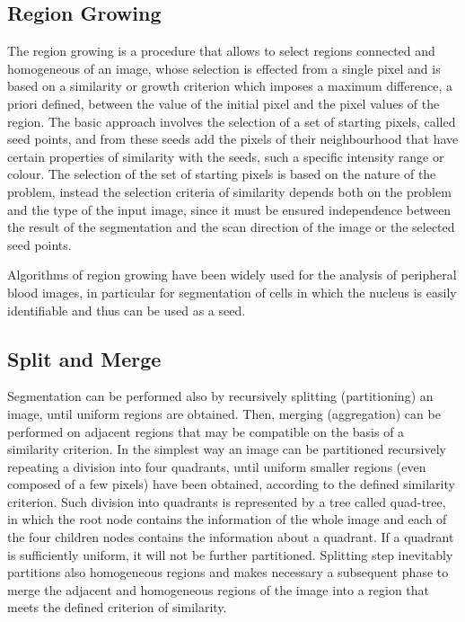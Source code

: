 \documentclass[final,a4paper,12pt,english]{UnicaPhdThesis3}
\begin{document}
\subsection{Region Growing} %
The region growing is a procedure that allows to select regions connected and homogeneous of an image, whose selection is effected from a single pixel and is based on a similarity or growth criterion which imposes a maximum difference, a priori defined, between the value of the initial pixel and the pixel values ​​of the region. The basic approach involves the selection of a set of starting pixels, called seed points, and from these seeds add the pixels of their neighbourhood that have certain properties of similarity with the seeds, such a specific intensity range or colour. The selection of the set of starting pixels is based on the nature of the problem, instead the selection criteria of similarity depends both on the problem and the type of the input image, since it must be ensured independence between the result of the segmentation and the scan direction of the image or the selected seed points. 

Algorithms of region growing have been widely used for the analysis of peripheral blood images, in particular for segmentation of cells in which the nucleus is easily identifiable and thus can be used as a seed. 

\subsection{Split and Merge} %
Segmentation can be performed also by recursively splitting (partitioning) an image, until uniform regions are obtained. Then, merging (aggregation) can be performed on adjacent regions that may be compatible on the basis of a similarity criterion. In the simplest way an image can be partitioned recursively repeating a division into four quadrants, until uniform smaller regions (even composed of a few pixels) have been obtained, according to the defined similarity criterion. Such division into quadrants is represented by a tree called quad-tree, in which the root node contains the information of the whole image and each of the four children nodes contains the information about a quadrant. If a quadrant is sufficiently uniform, it will not be further partitioned. Splitting step inevitably partitions also homogeneous regions and makes necessary a subsequent phase to merge the adjacent and homogeneous regions of the image into a region that meets the defined criterion of similarity.
\end{document}
